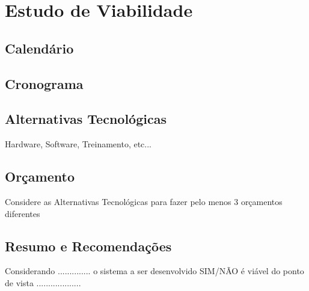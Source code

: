 \section{Estudo de Viabilidade}


       \subsection{Calend\'{a}rio }

       \subsection{Cronograma }

       \subsection{Alternativas Tecnol\'{o}gicas }
        Hardware, Software, Treinamento, etc...

       \subsection{Or\c{c}amento }
       Considere as Alternativas Tecnol\'{o}gicas para fazer pelo menos 3 or\c{c}amentos diferentes



       \subsection{Resumo e Recomenda\c{c}\~{o}es}

       Considerando .............. o sistema a ser desenvolvido SIM/N\~{A}O \'{e} vi\'{a}vel do ponto de vista ...................
